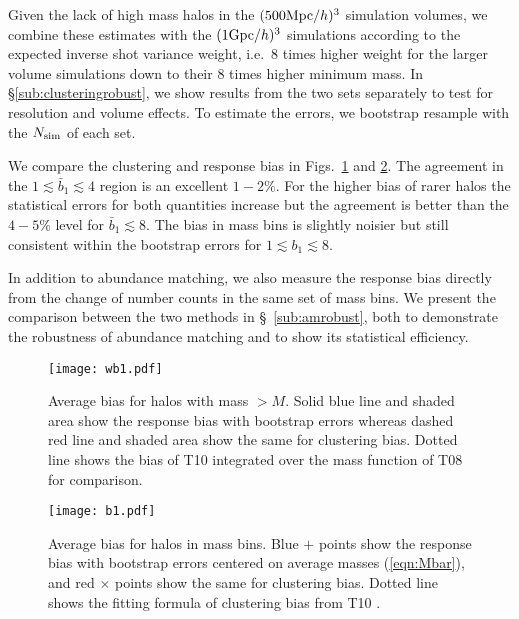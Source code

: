 \documentclass[prd,twocolumn,amsmath,amssymb,floatfix,superscriptaddress]{revtex4-1}
\begin{document}
Given the lack of high mass halos in the $(500 {\rm Mpc}/h)^3$ simulation volumes,
we combine these estimates with the $(1 {\rm Gpc}/h)^3$ simulations according to
the expected inverse shot variance weight, i.e.~8 times higher weight for the larger
volume simulations down to their 8 times higher minimum mass.  
In \S\ref{sub:clusteringrobust}, we show results from the two sets separately to test for
resolution and volume effects.
To estimate the errors, we bootstrap resample with the $N_{\rm sim}$ of each
set.    

We compare the clustering and response bias in Figs.~\ref{fig:wb1} and \ref{fig:b1}.
The agreement in the $1\lesssim \bar b_1 \lesssim 4$ region is
an excellent $1-2\%$.  For the higher bias of rarer halos the statistical errors for both quantities increase
but the agreement is better than the $4-5\%$ level for $\bar b_1 \lesssim 8$.
  The bias
in mass bins is slightly noisier but still consistent within the bootstrap errors for
$1 \lesssim b_1 \lesssim 8$.


In addition to abundance matching, we also measure the response bias directly
from the change of number counts in the same set of mass bins.
We present the comparison between the two methods in \S~\ref{sub:amrobust},
both to demonstrate the robustness of abundance matching
and to show its statistical efficiency.





\begin{figure}[tb]
    \centering
    \texttt{[image: wb1.pdf]}
    \caption{\footnotesize
     Average  bias for halos with mass $>M$.  Solid blue line and shaded area
     show the response bias with bootstrap errors 
     whereas dashed red line and shaded area show the same for
     clustering bias.   Dotted line shows the bias of T10 \cite{Tinkeretal:10} integrated over the mass
     function of T08 \cite{TinkerKravEtAl08}  for comparison. 
    }
    \label{fig:wb1}
\end{figure}

\begin{figure}[tb]
    \centering
    \texttt{[image: b1.pdf]}
    \caption{\footnotesize Average bias for halos in mass bins.   Blue $+$ points show the
        response bias with bootstrap errors centered on average masses (\ref{eqn:Mbar}),
        and red $\times$ points show the same for clustering bias. 
        Dotted line shows the fitting formula of clustering bias from T10 \cite{Tinkeretal:10}.
    }
    \label{fig:b1}
\end{figure}
\end{document}
